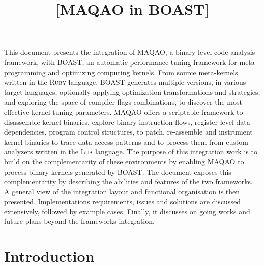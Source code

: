\documentclass[11pt, a4paper, twoside]{montblanc2}
\def\lua{\textsc{Lua}\xspace}
\def\ruby{\textsc{Ruby}\xspace}
\begin{document}
\devnum{[5.11]}
\title{[MAQAO in BOAST]}
\version{[0.1]}
\deadline{[2017/01/16]}
\level{[PU]}
\nature{[O]}
\contributors{} %
\reviewers{} %

\maketitle

\begin{changelog}
\end{changelog}

\frontmatter

\begin{executive}

  This document presents the integration of MAQAO, a binary-level code analysis 
  framework, with BOAST, an automatic performance tuning framework for 
  meta-programming and optimizing computing kernels. From source meta-kernels 
  written in the \ruby language, BOAST generates multiple versions, in various 
  target languages, optionally applying optimization transformations and 
  strategies, and exploring the space of compiler flags combinations, to 
  discover the most effective kernel tuning parameters. MAQAO offers a 
  scriptable framework to disassemble kernel binaries, explore binary 
  instruction flows, register-level data dependencies, program control 
  structures, to patch, re-assemble and instrument kernel binaries to trace data 
  access patterns and to process them from custom analyzers written in the \lua 
  language. The purpose of this integration work is to build on the 
  complementarity of these environments by enabling MAQAO to process binary 
  kernels generated by BOAST. The document exposes this complementarity by 
  describing the abilities and features of the two frameworks. A general view of 
  the integration layout and functional organisation is then presented. 
  Implementations requirements, issues and solutions are discussed extensively, 
  followed by example cases. Finally, it discusses on going works and future 
  plans beyond the frameworks integration.

\end{executive}

\section{Introduction}\label{sec:intro}
\end{document}
